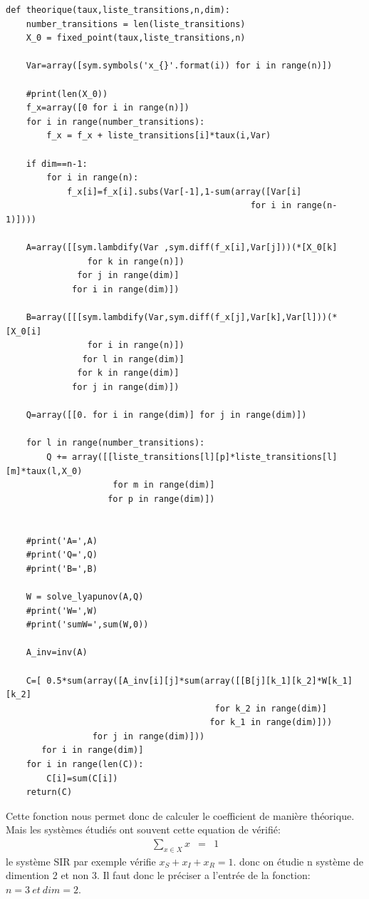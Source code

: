 \documentclass[a4paper]{article}
\begin{document}
\newpage
\begin{lstlisting}[frame=single]
  def theorique(taux,liste_transitions,n,dim):
    number_transitions = len(liste_transitions)  
    X_0 = fixed_point(taux,liste_transitions,n)
    
    Var=array([sym.symbols('x_{}'.format(i)) for i in range(n)])
    
    #print(len(X_0))
    f_x=array([0 for i in range(n)])
    for i in range(number_transitions):
        f_x = f_x + liste_transitions[i]*taux(i,Var)

    if dim==n-1:
        for i in range(n):
            f_x[i]=f_x[i].subs(Var[-1],1-sum(array([Var[i] 
                                                for i in range(n-1)])))

    A=array([[sym.lambdify(Var ,sym.diff(f_x[i],Var[j]))(*[X_0[k] 
                for k in range(n)]) 
              for j in range(dim)] 
             for i in range(dim)])

    B=array([[[sym.lambdify(Var,sym.diff(f_x[j],Var[k],Var[l]))(*[X_0[i] 
                for i in range(n)]) 
               for l in range(dim)] 
              for k in range(dim)] 
             for j in range(dim)])

    Q=array([[0. for i in range(dim)] for j in range(dim)])

    for l in range(number_transitions):
        Q += array([[liste_transitions[l][p]*liste_transitions[l][m]*taux(l,X_0) 
                     for m in range(dim)] 
                    for p in range(dim)])


    #print('A=',A)
    #print('Q=',Q)
    #print('B=',B)
    
    W = solve_lyapunov(A,Q)
    #print('W=',W)
    #print('sumW=',sum(W,0))

    A_inv=inv(A)
    
    C=[ 0.5*sum(array([A_inv[i][j]*sum(array([[B[j][k_1][k_2]*W[k_1][k_2] 
                                         for k_2 in range(dim)] 
                                        for k_1 in range(dim)])) 
                 for j in range(dim)])) 
       for i in range(dim)]
    for i in range(len(C)):
        C[i]=sum(C[i])
    return(C)
\end{lstlisting}

Cette fonction nous permet donc de calculer le coefficient de manière
théorique. Mais les systèmes étudiés ont souvent cette equation de
vérifié:
\begin{eqnarray*}
  \sum_{x \in X}x &=& 1
\end{eqnarray*}
le système SIR par exemple vérifie $x_S+x_I+x_R=1$. donc on étudie n
système de dimention 2 et non 3. Il faut donc le préciser a l'entrée
de la fonction: $n=3 \ et \ dim=2$.
\end{document}
